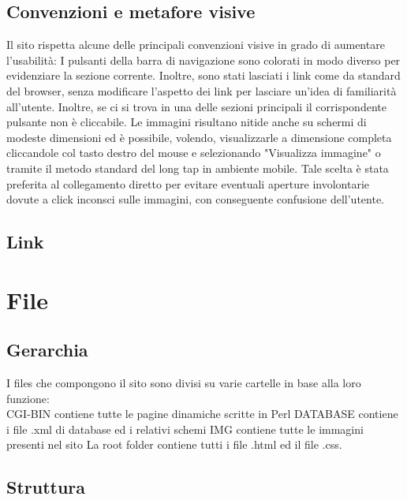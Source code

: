 \documentclass{article}
\begin{document}
\subsection{Convenzioni e metafore visive}
Il sito rispetta alcune delle principali convenzioni visive in grado di aumentare l'usabilità:\newline
			I pulsanti della barra di navigazione sono colorati in modo diverso per evidenziare la sezione corrente. Inoltre, sono stati lasciati i link come da standard del browser, senza modificare l'aspetto dei link per lasciare un'idea di familiarità all'utente.\newline
			Inoltre, se ci si trova in una delle sezioni principali il corrispondente pulsante non è cliccabile.
			Le immagini risultano nitide anche su schermi di modeste dimensioni ed è possibile, volendo, visualizzarle a dimensione completa cliccandole col tasto destro del mouse e selezionando "Visualizza immagine" o tramite il metodo standard del long tap in ambiente mobile. Tale scelta è stata preferita al collegamento diretto per evitare eventuali aperture involontarie dovute a click inconsci sulle immagini, con conseguente confusione dell'utente.\newline
\subsection{Link}

 \newpage

\section{File}
\subsection{Gerarchia}

	I files che compongono il sito sono divisi su varie cartelle in base alla loro\\ funzione:\\
		CGI-BIN contiene tutte le pagine dinamiche scritte in Perl
		DATABASE contiene i file .xml di database ed i relativi schemi
		IMG contiene tutte le immagini presenti nel sito
		La root folder contiene tutti i file .html ed il file .css. 
\subsection{Struttura}
\end{document}
